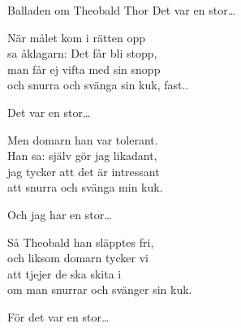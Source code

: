 \begin{song}{Balladen om Theobald Thor}
	\vspace{-.1cm}
	Det var en stor\ldots{}
	
    \showversenumber
	När målet kom i rätten opp\\
	sa åklagarn: Det får bli stopp,\\
	man får ej vifta med sin snopp\\
	och snurra och svänga sin kuk, fast..
	
	\vspace{-.1cm}
	Det var en stor\ldots{}
	
    \showversenumber
	Men domarn han var tolerant.\\
	Han sa: själv gör jag likadant,\\
	jag tycker att det är intressant\\
	att snurra och svänga min kuk.
	
	\vspace{-.1cm}
	Och jag har en stor\ldots{}
	
    \showversenumber
	Så Theobald han släpptes fri,\\
	och liksom domarn tycker vi\\
	att tjejer de ska skita i\\
	om man snurrar och svänger sin kuk.
	
	\vspace{-.1cm}
	För det var en stor\ldots{}
	
\end{song}
